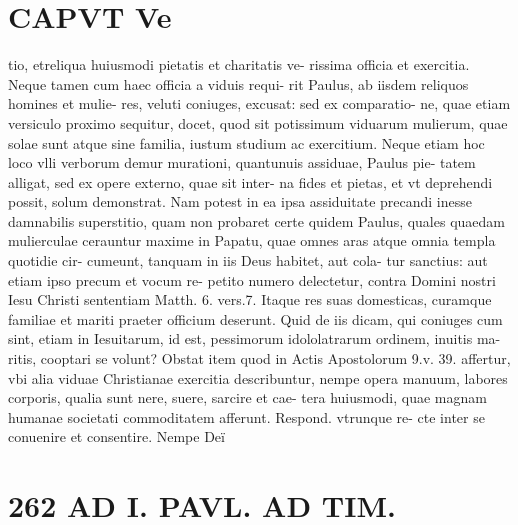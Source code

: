 \documentclass{article}
\begin{document}
\begin{pages}
\section*{CAPVT  Ve }
\marginpar{[ p.261 ]}\pstart tio, etreliqua huiusmodi pietatis et charitatis ve- rissima officia et exercitia. Neque tamen cum haec officia a viduis requi- rit Paulus, ab iisdem reliquos homines et mulie- res, veluti coniuges, excusat: sed ex comparatio- ne, quae etiam versiculo proximo sequitur, docet, quod sit potissimum viduarum mulierum, quae solae sunt atque sine familia, iustum studium ac exercitium. Neque etiam hoc loco vlli verborum demur murationi, quantunuis assiduae, Paulus pie- tatem alligat, sed ex opere externo, quae sit inter- na fides et pietas, et vt deprehendi possit, solum demonstrat. Nam potest in ea ipsa assiduitate precandi inesse damnabilis superstitio, quam non probaret certe quidem Paulus, quales quaedam mulierculae cerauntur maxime in Papatu, quae omnes aras atque omnia templa quotidie cir- cumeunt, tanquam in iis Deus habitet, aut cola- tur sanctius: aut etiam ipso precum et vocum re- petito numero delectetur, contra Domini nostri Iesu Christi sententiam Matth. 6. vers.7. Itaque res suas domesticas, curamque familiae et mariti praeter officium deserunt. Quid de iis dicam, qui coniuges cum sint, etiam in Iesuitarum, id est, pessimorum idololatrarum ordinem, inuitis ma- ritis, cooptari se volunt? Obstat item quod in Actis Apostolorum 9.v. 39. affertur, vbi alia viduae Christianae exercitia describuntur, nempe opera manuum, labores corporis, qualia sunt nere, suere, sarcire et cae- tera huiusmodi, quae magnam humanae societati commoditatem afferunt. Respond. vtrunque re- cte inter se conuenire et consentire. Nempe Deï  \pend
\section*{262 AD I. PAVL. AD TIM. }\pstart {}
{}

\end{pages}
\end{document}
